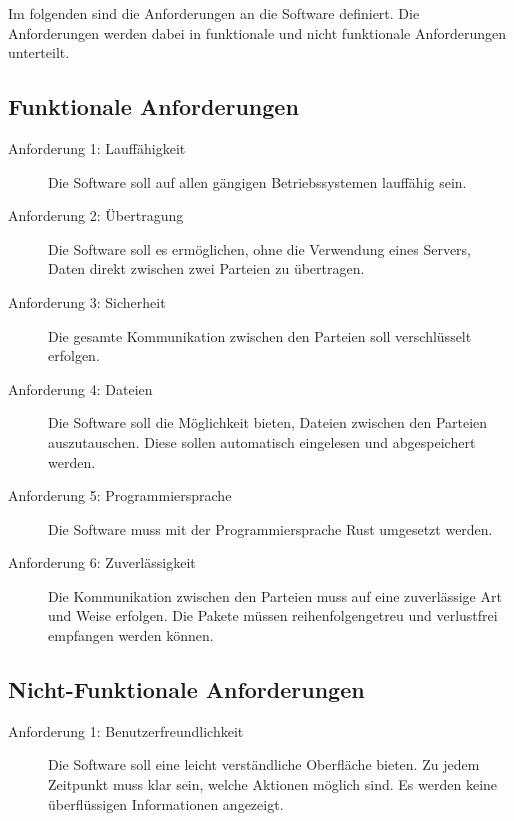 Im folgenden sind die Anforderungen an die Software definiert. Die Anforderungen werden dabei in funktionale und nicht funktionale Anforderungen unterteilt.


\subsection*{Funktionale Anforderungen}
\begin{description}
\item[Anforderung 1: Lauffähigkeit] Die Software soll auf allen gängigen Betriebssystemen lauffähig sein.
\item[Anforderung 2: Übertragung] Die Software soll es ermöglichen, ohne die Verwendung eines Servers, Daten direkt zwischen zwei Parteien zu übertragen.
\item[Anforderung 3: Sicherheit] Die gesamte Kommunikation zwischen den Parteien soll verschlüsselt erfolgen.
\item[Anforderung 4: Dateien] Die Software soll die Möglichkeit bieten, Dateien zwischen den Parteien auszutauschen. Diese sollen automatisch eingelesen und abgespeichert werden.
\item[Anforderung 5: Programmiersprache] Die Software muss mit der Programmiersprache Rust umgesetzt werden.
\item[Anforderung 6: Zuverlässigkeit] Die Kommunikation zwischen den Parteien muss auf eine zuverlässige Art und Weise erfolgen. Die Pakete müssen reihenfolgengetreu und verlustfrei empfangen werden können.
\end{description}

\subsection*{Nicht-Funktionale Anforderungen}
\begin{description}
\item[Anforderung 1: Benutzerfreundlichkeit] Die Software soll eine leicht verständliche Oberfläche bieten. Zu jedem Zeitpunkt muss klar sein, welche Aktionen möglich sind. Es werden keine überflüssigen Informationen angezeigt.
\end{description}
